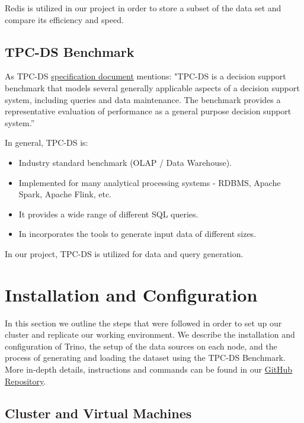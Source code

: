 \documentclass[conference]{IEEEtran}
\begin{document}
Redis is utilized in our project in order to store a subset of the data set and compare its efficiency and speed.

\subsection{TPC-DS Benchmark}

As TPC-DS \textcolor{linkblue}{\underline{\href{https://www.tpc.org/tpc_documents_current_versions/current_specifications5.asp}{specification document}}} mentions: "TPC-DS is a decision support
benchmark that models several generally applicable aspects of a decision support system, including queries and data maintenance. The benchmark provides a representative evaluation 
of performance as a general purpose decision support system.”

In general, TPC-DS is:

\begin{itemize}
    \item Industry standard benchmark (OLAP / Data Warehouse).
    \item Implemented for many analytical processing systems - RDBMS, Apache Spark, Apache Flink, etc. 
    \item It provides a wide range of different SQL queries.
    \item In incorporates the tools to generate input data of different sizes.
\end{itemize}

In our project, TPC-DS is utilized for data and query generation.

\section{Installation and Configuration}

In this section we outline the steps that were followed in order to set up our cluster and replicate our working
environment. We describe the installation and configuration of Trino, the setup of the data sources 
on each node, and the process of generating and loading the dataset using the TPC-DS Benchmark. 
More in-depth details, instructions and commands can be found in our \textcolor{linkblue}{\underline{\href{https://github.com/alex1on/Information-Systems-NTUA}{GitHub Repository}}}.
\subsection{Cluster and Virtual Machines}
\end{document}
